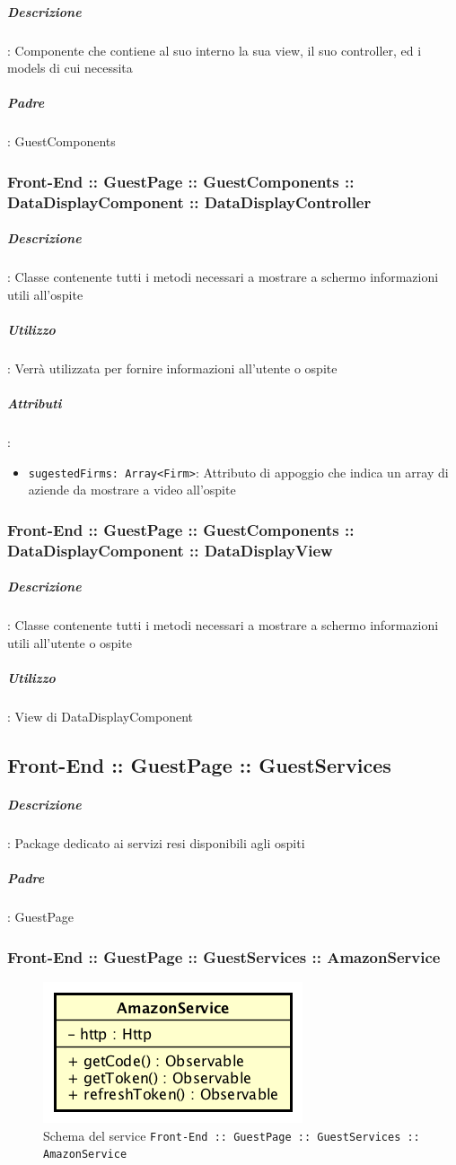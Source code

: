 \documentclass[../ManualeSviluppatore_v2.0.0.tex]{subfiles}
\begin{document}
			\subparagraph{Descrizione}: Componente che contiene al suo interno la sua view, il suo controller, ed i models di cui necessita
			\subparagraph{Padre}: GuestComponents
			
			\subsubsection{Front-End :: GuestPage :: GuestComponents :: DataDisplayComponent :: DataDisplayController}
				\subparagraph{Descrizione}: Classe contenente tutti i metodi necessari a mostrare a schermo informazioni utili all'ospite
				\subparagraph{Utilizzo}: Verrà utilizzata per fornire informazioni all'utente o ospite
				\subparagraph{Attributi}:
				\begin{itemize}
					\item \texttt{sugestedFirms: Array<Firm>}: Attributo di appoggio che indica un array di aziende da mostrare a video all'ospite
				\end{itemize}
			\subsubsection{Front-End :: GuestPage :: GuestComponents :: DataDisplayComponent :: DataDisplayView}

				\subparagraph{Descrizione}: Classe contenente tutti i metodi necessari a mostrare a schermo informazioni utili all'utente o ospite
				\subparagraph{Utilizzo}: View di DataDisplayComponent

	\newpage
	\subsection{Front-End :: GuestPage :: GuestServices}
	
			\subparagraph{Descrizione}: Package dedicato ai servizi resi disponibili agli ospiti 
			\subparagraph{Padre}: GuestPage
		
			\subsubsection{Front-End :: GuestPage :: GuestServices :: AmazonService}
			\begin{figure}[!h]
				\centering
				\includegraphics[scale=0.6]{Architettura/Front-End/GuestPage/GuestServices/AmazonService.png}
				\caption{Schema del service \texttt{Front-End :: GuestPage :: GuestServices :: AmazonService}}
			\end{figure}
\end{document}
